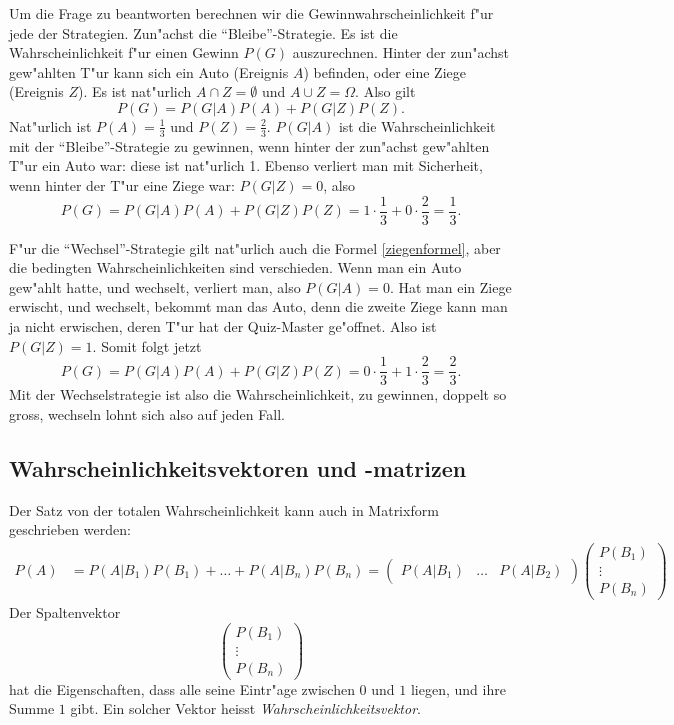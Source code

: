 Um die Frage zu beantworten berechnen wir die Gewinnwahrscheinlichkeit
f"ur jede der Strategien. Zun"achst die ``Bleibe''-Strategie. Es ist die
Wahrscheinlichkeit f"ur einen Gewinn $P(G)$ auszurechnen. Hinter der zun"achst
gew"ahlten T"ur kann sich ein Auto (Ereignis $A$) befinden, oder eine Ziege
(Ereignis $Z$). Es ist nat"urlich $A\cap Z=\emptyset$ und $A\cup Z=\Omega$.
Also gilt
\begin{equation}
P(G)=P(G|A) P(A) + P(G|Z)P(Z).
\label{ziegenformel}
\end{equation}
Nat"urlich ist $P(A)=\frac13$ und $P(Z)=\frac23$.
$P(G|A)$ ist die Wahrscheinlichkeit mit der ``Bleibe''-Strategie zu
gewinnen, wenn hinter der zun"achst gew"ahlten T"ur ein Auto war: diese
ist nat"urlich 1. Ebenso verliert man mit Sicherheit, wenn hinter der
T"ur eine Ziege war: $P(G|Z)=0$, also
\[
P(G)=P(G|A)P(A)+P(G|Z)P(Z)=1\cdot \frac13 + 0\cdot\frac 23=\frac13.
\]

F"ur die ``Wechsel''-Strategie gilt nat"urlich auch die Formel
\ref{ziegenformel}, aber die bedingten Wahrscheinlichkeiten sind verschieden.
Wenn man ein Auto gew"ahlt hatte, und wechselt, verliert man, also $P(G|A)=0$.
Hat man ein Ziege erwischt, und wechselt, bekommt man das Auto, denn die
zweite Ziege kann man ja nicht erwischen, deren T"ur hat der Quiz-Master
ge"offnet. Also ist $P(G|Z)=1$. Somit folgt jetzt
\[
P(G)=P(G|A)P(A)+P(G|Z)P(Z)=0\cdot\frac13+1\cdot\frac23=\frac23.
\]
Mit der Wechselstrategie ist also die Wahrscheinlichkeit, zu gewinnen,
doppelt so gross, wechseln lohnt sich also auf jeden Fall.


\subsection{Wahrscheinlichkeitsvektoren und -matrizen}
Der Satz von der totalen Wahrscheinlichkeit kann auch in Matrixform
geschrieben werden:
\begin{align*}
P(A)&=P(A|B_1)P(B_1)+\dots+P(A|B_n)P(B_n)
=
\begin{pmatrix}
P(A|B_1)&\dots&P(A|B_2)
\end{pmatrix}
\begin{pmatrix}
P(B_1)\\\vdots\\P(B_n)
\end{pmatrix}
\end{align*}
Der Spaltenvektor
\[
\begin{pmatrix}
P(B_1)\\\vdots\\P(B_n)
\end{pmatrix}
\]
hat die Eigenschaften, dass alle seine Eintr"age zwischen $0$ und $1$
liegen, und ihre Summe $1$ gibt.
Ein solcher Vektor heisst {\it Wahrscheinlichkeitsvektor}.

